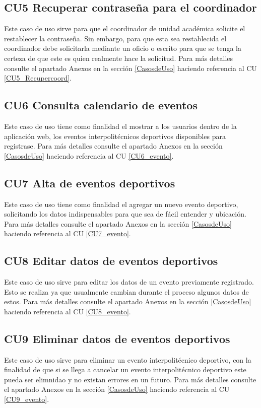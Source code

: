 		\subsection{CU5 Recuperar contraseña para el coordinador}
		\noindent Este caso de uso sirve para que el coordinador de unidad académica solicite el restablecer la contraseña. Sin embargo, para que esta sea restablecida el coordinador debe solicitarla mediante un oficio o escrito para que se tenga la certeza de que este es quien realmente hace la solicitud. Para más detalles consulte el apartado Anexos en la sección \ref{CasosdeUso} haciendo referencia al CU \ref{CU5_Recupercoord}.\\ 
		
		\subsection{CU6 Consulta calendario de eventos}
		\noindent Este caso de uso tiene como finalidad el mostrar a los usuarios dentro de la aplicación web, los eventos interpolitécnicos deportivos disponibles para registrase. Para más detalles consulte el apartado Anexos en la sección \ref{CasosdeUso} haciendo referencia al CU \ref{CU6_evento}. \\
		
		\subsection{CU7 Alta de eventos deportivos}
		\noindent Este caso de uso tiene como finalidad el agregar un nuevo evento deportivo, solicitando los datos indispensables para que sea de fácil entender y ubicación. Para más detalles consulte el apartado Anexos en la sección \ref{CasosdeUso} haciendo referencia al CU \ref{CU7_evento}.\\
		
		\subsection{CU8 Editar datos de eventos deportivos}
		\noindent Este caso de uso sirve para  editar los datos de un evento previamente registrado. Esto se realiza ya que usualmente cambian durante el proceso algunos datos de estos. Para más detalles consulte el apartado Anexos en la sección \ref{CasosdeUso} haciendo referencia al CU \ref{CU8_evento}. \\
		
		\subsection{CU9 Eliminar datos de eventos deportivos}
		\noindent Este caso de uso sirve para eliminar un evento interpolitécnico deportivo, con la finalidad de que si se llega a cancelar un evento interpolitécnico deportivo este pueda ser elimnidao y no existan errores en un futuro. Para más detalles consulte el apartado Anexos en la sección \ref{CasosdeUso} haciendo referencia al CU \ref{CU9_evento}.\\
		
